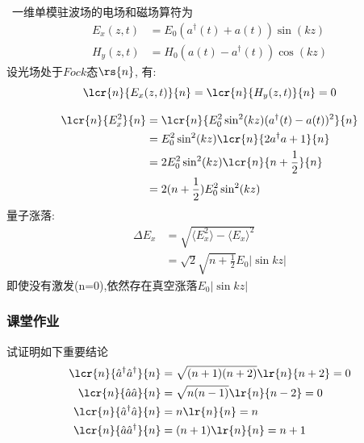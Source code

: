 \begin{frame}
    \frametitle{}
    \解~一维单模驻波场的电场和磁场算符为  
    \[ \begin{aligned}
      E_x(z,t)
      &= E_0  (a^\dagger(t)+a(t) )\sin (kz) \\ 
      H_y(z,t)  
      &= H_0 (a(t) - a^\dagger(t)) \cos (kz)
   \end{aligned} \]
   设光场处于$Fock$态$\rs{n}$, 有:
   \[ \lcr{n}{E_x(z,t)}{n} = \lcr{n}{H_y(z,t)}{n} =0\]
  \end{frame}

  \begin{frame}
   \[ \begin{aligned}
     \lcr{n}{E^2_x}{n} &= \lcr{n}{E^2_0 \sin^2 (kz) (a^\dagger(t)-a(t))^2}{n} \\
     &= E^2_0 \sin^2 (kz) \lcr{n}{2a^\dagger a+1}{n} \\ 
     &= 2 E^2_0 \sin^2 (kz) \lcr{n}{n+\frac{1}{2}}{n} \\ 
     &= 2 (n+\frac{1}{2})E^2_0 \sin^2 (kz)  
  \end{aligned} \]
  量子涨落: 
  \[
 \begin{aligned}
        \Delta E_x &= \sqrt{\langle E^2_x\rangle - \langle E_x\rangle ^2} \\
        &= \sqrt{2} \sqrt{n+\frac{1}{2}} E_0 \left|\sin kz \right| 
 \end{aligned} \]
 即使没有激发(n=0),依然存在真空涨落$ E_0 \left|\sin kz \right|  $  
\end{frame}

\begin{frame}
  \frametitle{课堂作业}
   \begin{block}{试证明如下重要结论}
   \[
  \begin{aligned}
   \lcr{n}{\hat{a} ^\dagger\hat{a} ^\dagger}{n} & = \sqrt{(n+1)(n+2)} \lr{n}{n+2}=0   \\     
   \lcr{n}{\hat{a} \hat{a} }{n} & = \sqrt{n(n-1)} \lr{n}{n-2}=0   \\  
   \lcr{n}{\hat{a} ^\dagger\hat{a} }{n} & = n  \lr{n}{n}=n   \\   
   \lcr{n}{\hat{a} \hat{a} ^\dagger}{n} & = (n+1)  \lr{n}{n}=n+1   \\    
  \end{aligned}
  \]
   \end{block}
\end{frame}

